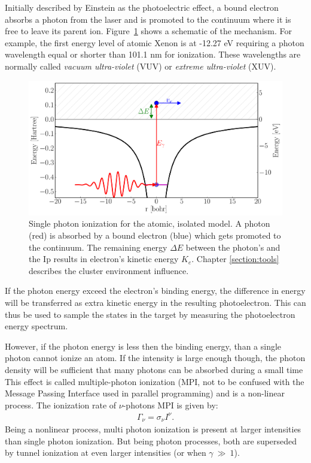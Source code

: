 Initially described by Einstein as the photoelectric effect, a bound electron
absorbs a photon from the laser and is promoted to the continuum where it is
free to leave its parent ion. Figure~\ref{fig:ionization:single} shows a
schematic of the mechanism. For example, the first energy level of atomic
Xenon is at -12.27 eV requiring a photon wavelength equal or shorter than
101.1 nm for ionization. These wavelengths are normally called
\textit{vacuum ultra-violet} (VUV) or \textit{extreme ultra-violet} (XUV).



\begin{figure}
 \centering
 \includegraphics[width=\figurewidth]{figures/ionization_single}
 \caption{Single photon ionization for the atomic, isolated model. A photon
          (red) is absorbed by a bound electron (blue) which gets promoted to
          the continuum. The remaining energy $\Delta E$ between the photon's
          and the Ip results in electron's kinetic energy $K_e$.
          Chapter \ref{section:tools} describes the cluster environment
          influence.}
 \label{fig:ionization:single}
\end{figure}

If the photon energy exceed the electron's binding energy, the difference in energy
will be transferred as extra kinetic energy in the
resulting photoelectron. This can thus be used to sample the states in the
target by measuring the photoelectron energy spectrum\cite{Fennel2010}.

However, if the photon energy is less then the binding energy, than a single
photon cannot ionize an atom. If the intensity is large enough though, the
photon density will be sufficient that many photons can be absorbed during a
small time%
%
This effect is called multiple-photon ionization (MPI, not to
be confused with the Message Passing Interface used in parallel programming) and
is a non-linear process. The ionization rate of $\nu$-photons MPI is given
by\cite{Fennel2010}:
\begin{align}
\Gamma_{\nu} = \sigma_{\nu} I^{\nu}.
\label{eqn:ionization:rate:mpi}
\end{align}
Being a nonlinear process, multi photon ionization is present at larger
intensities than single photon ionization. But being photon processes, both are
superseded by tunnel ionization at even larger intensities (or when
$\gamma~\gg~1$).

